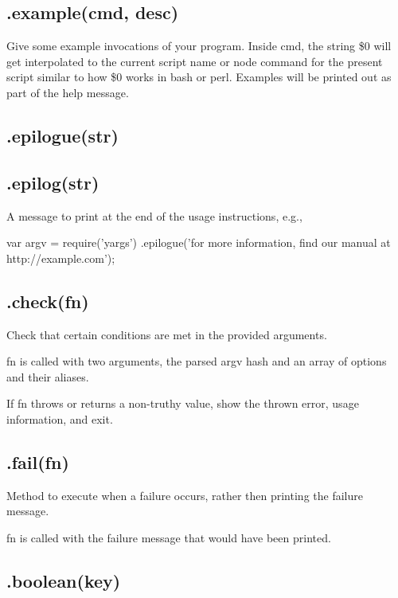 \subsection*{.example(cmd, desc) }

Give some example invocations of your program. Inside {\ttfamily cmd}, the string {\ttfamily \$0} will get interpolated to the current script name or node command for the present script similar to how {\ttfamily \$0} works in bash or perl. Examples will be printed out as part of the help message.

\subsection*{.epilogue(str) }

\subsection*{.epilog(str) }

A message to print at the end of the usage instructions, e.\+g.,


\begin{DoxyCode}
var argv = require(\textcolor{stringliteral}{'yargs'})
  .epilogue(\textcolor{stringliteral}{'for more information, find our manual at http://example.com'});
\end{DoxyCode}


\subsection*{.check(fn) }

Check that certain conditions are met in the provided arguments.

{\ttfamily fn} is called with two arguments, the parsed {\ttfamily argv} hash and an array of options and their aliases.

If {\ttfamily fn} throws or returns a non-\/truthy value, show the thrown error, usage information, and exit.

\subsection*{.fail(fn) }

Method to execute when a failure occurs, rather then printing the failure message.

{\ttfamily fn} is called with the failure message that would have been printed.

\subsection*{.boolean(key) }

